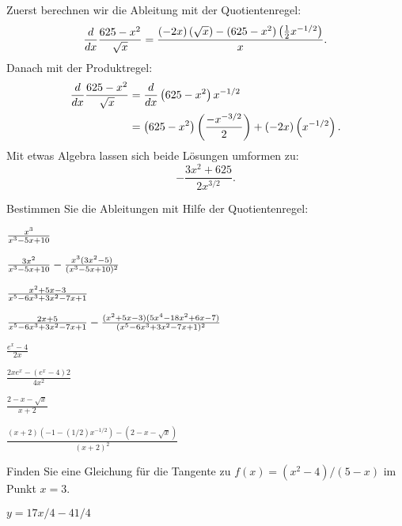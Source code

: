\begin{solution} 
Zuerst berechnen wir die Ableitung mit der Quotientenregel:
\[
\frac{d}{dx} \frac{625-x^2}{\sqrt{x}} = \frac{\left(-2x\right)\left(\sqrt{x}\right) - (625-x^2)\left(\frac{1}{2}x^{-1/2}\right)}{x}.
\]
Danach mit der Produktregel:
\begin{align*}
\frac{d}{dx} \frac{625-x^2}{\sqrt{x}} &= \frac{d}{dx} \left(625-x^2\right)x^{-1/2}\\
&=\left(625-x^2\right)\left(\frac{-x^{-3/2}}{2}\right)+ (-2x)\left(x^{-1/2}\right).
\end{align*}
Mit etwas Algebra lassen sich beide Lösungen umformen zu:
\[
-\frac{3x^2+625}{2x^{3/2}}.
\]
\end{solution}


\begin{exercises}

\noindent Bestimmen Sie die Ableitungen mit Hilfe der Quotientenregel:

\twocol

\begin{exercise} ${x^3\over x^3-5x+10}$
\begin{answer} ${3x^2\over x^3-5x+10}-{x^3(3x^2-5)\over (x^3-5x+10)^2}$
\end{answer}\end{exercise}

\begin{exercise} ${x^2+5x-3\over x^5-6x^3+3x^2-7x+1}$
\begin{answer} ${2x+5\over x^5-6x^3+3x^2-7x+1}-
{(x^2+5x-3)(5x^4-18x^2+6x-7)\over(x^5-6x^3+3x^2-7x+1)^2}$
\end{answer}\end{exercise}


\begin{exercise} $\frac{e^x-4}{2x}$
\begin{answer} $\frac{2xe^x-(e^x-4)2}{4x^2}$
\end{answer}\end{exercise}

\begin{exercise} $\frac{2-x-\sqrt{x}}{x+2}$
\begin{answer} $\frac{(x+2)(-1-(1/2)x^{-1/2}) - (2-x-\sqrt{x})}{(x+2)^2}$
\end{answer}\end{exercise}
\endtwocol


\begin{exercise} Finden Sie eine Gleichung für die Tangente zu $f(x) = (x^2 -
4)/(5-x)$ im Punkt $x= 3$.  
\begin{answer} $y=17x/4-41/4$ 
\end{answer}\end{exercise}


\end{exercises}
